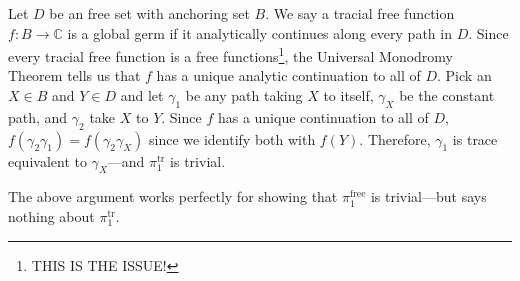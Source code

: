 \documentclass[11pt]{exam}
\newcommand{\CC}{\mathbb{C}}
\begin{document}
Let $D$ be an free set with anchoring set $B$. We say a tracial free function
$f: B \to \CC $ is a global germ if it analytically continues along every path
in $D$. Since every tracial free function is a free functions\footnote{THIS IS
  THE ISSUE!},  the
Universal Monodromy Theorem tells us that $f$ has a unique analytic
continuation to all of $D$. Pick an $X \in B$ and $Y \in D$ and
let $\gamma_1$ be any path taking $X$ to itself, $\gamma_X$ be the constant
path, and $\gamma_2$ take $X$ to  $Y$. Since $f$ has a unique continuation to all of $D$,
$f(\gamma_2\gamma_1) = f(\gamma_2\gamma_X)$ since we identify both with $f(Y)$.
Therefore, $\gamma_1$ is trace equivalent to $\gamma_X$---and
$\pi_1^{\text{tr} }$ is trivial.

The above argument works perfectly for showing that $\pi_1^{\text{free} }$ is
trivial---but says nothing about $\pi_1^{\text{tr} }$.
\end{document}
